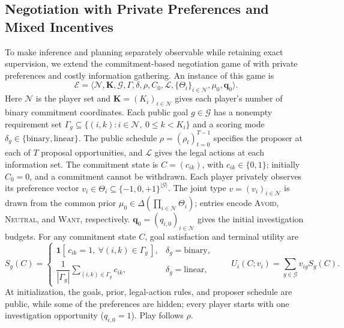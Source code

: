 \subsection{Negotiation with Private Preferences and Mixed Incentives}
\label{sec:benac-i}

To make inference and planning separately observable while retaining exact
supervision, we extend the commitment-based negotiation game of
\citet{benac2026benchmark} with private preferences and costly information
gathering. An instance of this game is
\begin{equation}
 \mathcal E=\langle\mathcal N,\mathbf K,\mathcal G,\Gamma,\delta,
 \rho,C_0,\mathcal L,\{\Theta_i\}_{i\in\mathcal N},\mu_0,\mathbf q_0\rangle .
 \label{eq:benac-i-game}
\end{equation}
Here $\mathcal N$ is the player set and $\mathbf K=(K_i)_{i\in\mathcal N}$
gives each player's number of binary commitment coordinates. Each public goal
$g\in\mathcal G$ has a nonempty requirement set
$\Gamma_g\subseteq\{(i,k):i\in\mathcal N,\ 0\leq k<K_i\}$ and a scoring mode
$\delta_g\in\{\mathrm{binary},\mathrm{linear}\}$. The public schedule
$\rho=(\rho_t)_{t=0}^{T-1}$ specifies the proposer at each of $T$ proposal
opportunities, and $\mathcal L$ gives the legal actions at each information
set. The commitment state is $C=(c_{ik})$, with $c_{ik}\in\{0,1\}$; initially
$C_0=0$, and a commitment cannot be withdrawn. Each player privately observes
its preference vector $v_i\in\Theta_i\subseteq\{-1,0,+1\}^{|\mathcal G|}$.
The joint type $v=(v_i)_{i\in\mathcal N}$ is drawn from the common prior
$\mu_0\in\Delta(\prod_{i\in\mathcal N}\Theta_i)$; entries encode
\textsc{Avoid}, \textsc{Neutral}, and \textsc{Want}, respectively.
$\mathbf q_0=(q_{i,0})_{i\in\mathcal N}$ gives the initial investigation
budgets. For any commitment state $C$, goal satisfaction and terminal utility
are
\begin{equation}
 S_g(C)=
 \begin{cases}
 \mathbf 1[\,c_{ik}=1,\ \forall(i,k)\in\Gamma_g\,],&\delta_g=\mathrm{binary},\\
 \dfrac{1}{|\Gamma_g|}\sum_{(i,k)\in\Gamma_g}c_{ik},&\delta_g=\mathrm{linear},
 \end{cases}
 \qquad U_i(C;v_i)=\sum_{g\in\mathcal G}v_{ig}S_g(C).
 \label{eq:benac-i-utility}
\end{equation}
At initialization, the goals, prior, legal-action rules, and proposer schedule are
public, while some of the preferences are hidden; every player
starts with one investigation opportunity ($q_{i,0}=1$). Play follows $\rho$.
